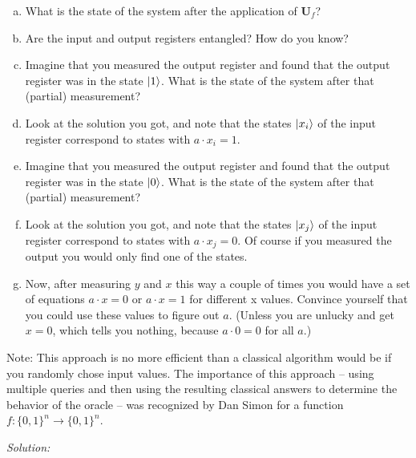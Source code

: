 \documentclass{book}
\theoremstyle{definition}
\newcommand{\U}{\mathbf{U}}
\begin{document}
\begin{enumerate}[(a)]
	\item What is the state of the system after the application of $\U_f$?
	\item Are the input and output registers entangled? How do you know?

	\item Imagine that you measured the output register and found that the output register was
	in the state $\ket{1}$. What is the state of the system after that (partial) measurement?

	\item Look at the solution you got, and note that the states $\ket{x_i}$ of the input register correspond to states with $a \cdot x_i = 1$.
	\item  Imagine that you measured the output register and found that the output register was in the state $\ket{0}$. What is the state of the system after that (partial) measurement?
	\item  Look at the solution you got, and note that the states $\ket{x_j}$ of the input register correspond to states with $a \cdot x_j = 0$. Of course if you measured the output you would only find one
	of the states.

	\item Now, after measuring $y$ and $x$ this way a couple of times you would have a set of equations
	$a \cdot x = 0 \text{ or } a \cdot x = 1$ for different x values. Convince yourself that you could use these values to figure out $a$. (Unless you are unlucky and get $x = 0$, which tells you nothing,
	because $a \cdot 0 = 0$ for all $a$.)

\end{enumerate}

Note: This approach is no more efficient than a classical algorithm would be if you randomly
chose input values. The importance of this approach – using multiple queries and then using
the resulting classical answers to determine the behavior of the oracle – was recognized by
Dan Simon for a function $f : \{0, 1\}^n \to \{0, 1\}^n$.\\







\newpage


\noindent \textit{Solution:}
\end{document}
